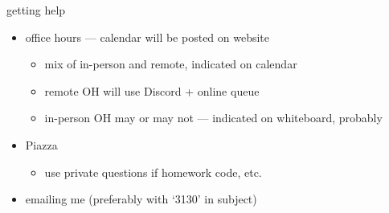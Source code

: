 \begin{frame}{getting help}
    \begin{itemize}
    \item office hours --- calendar will be posted on website
        \begin{itemize}
        \item mix of in-person and remote, indicated on calendar
        \item remote OH will use Discord + online queue
        \item in-person OH may or may not --- indicated on whiteboard, probably
        \end{itemize}
    \item Piazza
        \begin{itemize}
        \item use private questions if homework code, etc.
        \end{itemize}
    \item emailing me (preferably with `3130' in subject)
    \end{itemize}
\end{frame}
